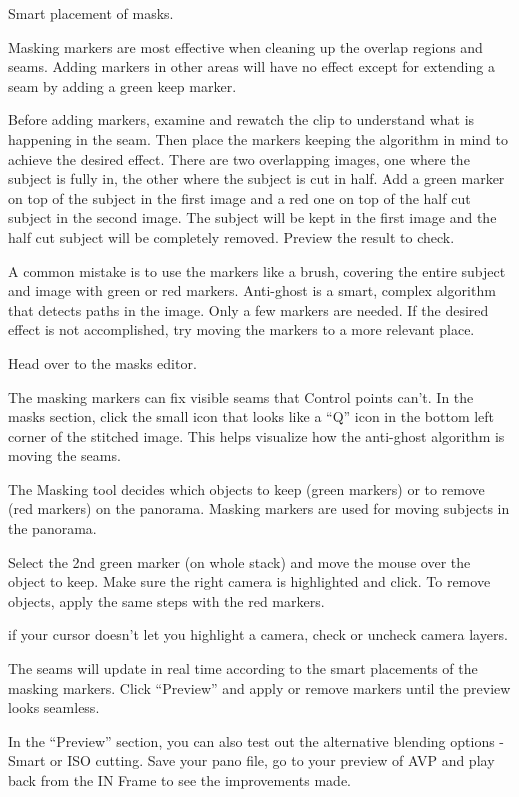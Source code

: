 \begin{fullwidth}
{\large Smart placement of masks. \par}

Masking markers are most effective when cleaning up the overlap regions and seams. Adding markers in other areas will have no effect except for extending a seam by adding a green keep marker. 

Before adding markers, examine and rewatch the clip to understand what is happening in the seam. Then place the markers keeping the algorithm in mind to achieve the desired effect. There are two overlapping images, one where the subject is fully in, the other where the subject is cut in half. Add a green marker on top of the subject in the first image and a red one on top of the half cut subject in the second image. The subject will be kept in the first image and the half cut subject will be completely removed. Preview the result to check.

A common mistake is to use the markers like a brush, covering the entire subject and image with green or red markers. Anti-ghost is a smart, complex algorithm that detects paths in the image. Only a few markers are needed. If the desired effect is not accomplished, try moving the markers to a more relevant place. 

Head over to the masks editor.

The masking markers can fix visible seams that Control points can’t. In the masks section, click the small icon that looks like a “Q” icon in the bottom left corner of the stitched image. This helps visualize how the anti-ghost algorithm is moving the seams.

The Masking tool decides which objects to keep (green markers) or to remove (red markers) on the panorama. Masking markers are used for moving subjects in the panorama.

Select the 2nd green marker (on whole stack) and move the mouse over the object to keep. Make sure the right camera is highlighted and click. To remove objects, apply the same steps with the red markers.

\tip if your cursor doesn’t let you highlight a camera, check or uncheck camera layers.

The seams will update in real time according to the smart placements of the masking markers. Click “Preview” and apply or remove markers until the preview looks seamless.

In the “Preview” section, you can also test out the alternative blending options - Smart or ISO cutting. Save your pano file, go to your preview of AVP and play back from the IN Frame to see the improvements made.


\clearpage
\end{fullwidth}